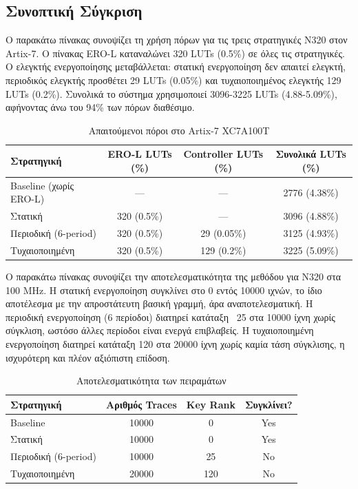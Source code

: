 \subsection*{Συνοπτική Σύγκριση} 
Ο παρακάτω πίνακας συνοψίζει τη χρήση πόρων για τις τρεις στρατηγικές N320 στον Artix-7. Ο πίνακας ERO-L καταναλώνει 320 LUTs (0.5\%) σε όλες τις στρατηγικές. Ο ελεγκτής ενεργοποίησης μεταβάλλεται: στατική ενεργοποίηση δεν απαιτεί ελεγκτή, περιοδικός ελεγκτής προσθέτει 29 LUTs (0.05\%) και τυχαιοποιημένος ελεγκτής 129 LUTs (0.2\%). Συνολικά το σύστημα χρησιμοποιεί 3096-3225 LUTs (4.88-5.09\%), αφήνοντας άνω του 94\% των πόρων διαθέσιμο.

\begin{table}[h]
\centering
\begin{tabular}{lccc}
\hline
\textbf{Στρατηγική} & \textbf{ERO-L LUTs (\%)} & \textbf{Controller LUTs (\%)} & \textbf{Συνολικά LUTs (\%)} \\
\hline
Baseline (χωρίς ERO-L) & ---         & ---         & 2776 (4.38\%) \\
Στατική              & 320 (0.5\%) & ---         & 3096 (4.88\%) \\
Περιοδική (6-period) & 320 (0.5\%) & 29 (0.05\%) & 3125 (4.93\%) \\
Τυχαιοποιημένη          & 320 (0.5\%) & 129 (0.2\%) & 3225 (5.09\%) \\
\hline
\end{tabular}
\caption*{Απαιτούμενοι πόροι στο Artix-7 XC7A100T}
\label{tab:lut_utilization_el}
\end{table}

Ο παρακάτω πίνακας συνοψίζει την αποτελεσματικότητα της μεθόδου για N320 στα 100 MHz. Η στατική ενεργοποίηση συγκλίνει στο 0 εντός 10000 ιχνών, το ίδιο αποτέλεσμα με την απροστάτευτη βασική γραμμή, άρα αναποτελεσματική. Η περιοδική ενεργοποίηση (6 περίοδοι) διατηρεί κατάταξη ~25 στα 10000 ίχνη χωρίς σύγκλιση, ωστόσο άλλες περίοδοι είναι ενεργά επιβλαβείς. Η τυχαιοποιημένη ενεργοποίηση διατηρεί κατάταξη 120 στα 20000 ίχνη χωρίς καμία τάση σύγκλισης, η ισχυρότερη και πλέον αξιόπιστη επίδοση.

\begin{table}[h]
\centering
\begin{tabular}{lccc}
\hline
\textbf{Στρατηγική} & \textbf{Αριθμός Traces} & \textbf{Key Rank} & \textbf{Συγκλίνει?} \\
\hline
Baseline            & 10000 & 0   & Yes \\
Στατική              & 10000 & 0   & Yes \\
Περιοδική (6-period) & 10000 & 25  & No \\
Τυχαιοποιημένη          & 20000 & 120 & No \\
\hline
\end{tabular}
\caption*{Αποτελεσματικότητα των πειραμάτων}
\label{tab:obfuscation_effectiveness_el}
\end{table}
